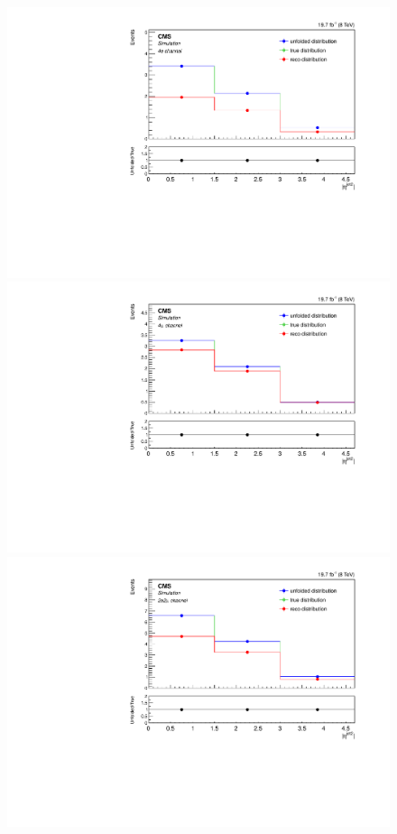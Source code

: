 \begin{figure}[hbtp]
\begin{center}
     \includegraphics[width=0.8\cmsFigWidth]{Figures/Unfolding/MCTests/EtaJet2_ZZTo4e_PowMatrix_PowDistr_FullSample_fr}     
    \includegraphics[width=0.8\cmsFigWidth]{Figures/Unfolding/MCTests/EtaJet2_ZZTo4m_PowMatrix_PowDistr_FullSample_fr}     
    \includegraphics[width=0.8\cmsFigWidth]{Figures/Unfolding/MCTests/EtaJet2_ZZTo2e2m_PowMatrix_PowDistr_FullSample_fr}      

\end{center}
\end{figure}
